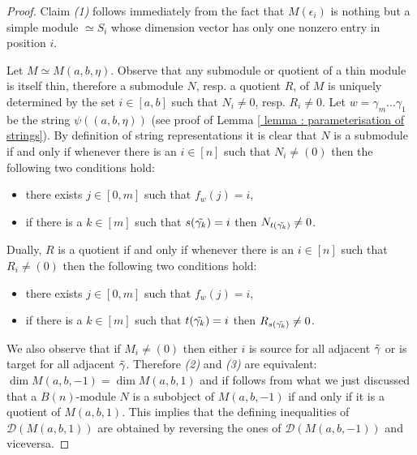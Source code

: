 \documentclass[11pt]{amsart}
\theoremstyle{definition}
\begin{document}
\begin{proof}
    Claim \emph{(1)} follows immediately from the fact that $M(\epsilon_i)$ is nothing but a simple module $\simeq S_i$ whose dimension vector has only one nonzero entry in position $i$.

 Let $M\simeq M(a,b,\eta)$. Observe that any submodule or quotient of a thin module is itself thin, therefore a submodule $N$, resp.  a quotient $R$, of $M$ is uniquely determined by the set $i\in [a,b]$ such that $N_i\neq 0$, resp. $R_i\neq 0$. Let $w=\gamma_m\ldots \gamma_1$ be the string $\psi((a,b,\eta))$ (see proof of Lemma \ref{ lemma : parameterisation of strings}).  By definition of string representations it is clear that $N$ is a submodule if and only if whenever there is an $i\in[n]$ such that $N_i\neq (0)$ then the following two conditions hold:
 \begin{itemize}
     \item there exists  $j\in[0,m]$ such that $f_w(j)=i$,
     \item if there is a $k\in[m]$ such that $s(\Tilde{\gamma_k})=i$ then $N_{t(\Tilde{\gamma_k})}\neq 0$.
 \end{itemize}
 Dually, $R$ is a quotient if and only if whenever there is an $i\in[n]$ such that $R_i\neq (0)$ then the following two conditions hold:
 \begin{itemize}
     \item there exists  $j\in[0,m]$ such that $f_w(j)=i$,
     \item if there is a $k\in[m]$ such that $t(\Tilde{\gamma_k})=i$ then $R_{s(\Tilde{\gamma_k})}\neq 0$.
 \end{itemize}
We also observe that if $M_i\neq (0)$ then either $i$ is source for all adjacent $\Tilde{\gamma}$ or is target for all adjacent $\Tilde{\gamma}$. Therefore \emph{(2)} and \emph{(3)} are  equivalent: $\dim M(a,b,-1)=\dim M(a,b,1)$ and if follows from what we just discussed that a $B(n)$-module $N$ is a subobject of $M(a,b,-1)$ if and only if it is a quotient of $M(a,b,1)$. This implies that the defining inequalities of $\mathcal{D}(M(a,b,1))$ are obtained by reversing the ones of $\mathcal{D}(M(a,b,-1))$ and viceversa. 


\end{proof}
\end{document}
